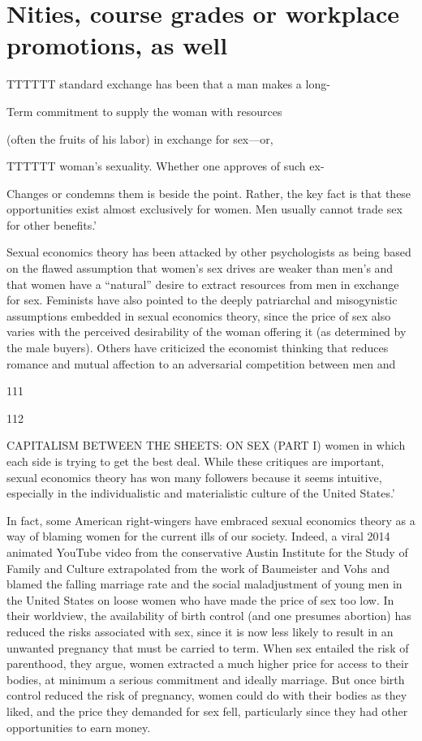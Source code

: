 \section{Nities, course grades or workplace promotions, as well}
 \par 
TTTTTT standard exchange has been that a man makes a long-
 \par 
Term commitment to supply the woman with resources
 \par 
(often the fruits of his labor) in exchange for sex—or,
 \par 
TTTTTT woman’s sexuality. Whether one approves of such ex-
 \par 
Changes or condemns them is beside the point. Rather, the key fact is that these opportunities exist almost exclusively for women. Men usually cannot trade sex for other benefits.’
 \par 
Sexual economics theory has been attacked by other psychologists as being based on the flawed assumption that women’s sex drives are weaker than men’s and that women have a “natural” desire to extract resources from men in exchange for sex. Feminists have also pointed to the deeply patriarchal and misogynistic assumptions embedded in sexual economics theory, since the price of sex also varies with the perceived desirability of the woman offering it (as determined by the male buyers). Others have criticized the economist thinking that reduces romance and mutual affection to an adversarial competition between men and
 \par 
111
 \par 
112
 \par 
CAPITALISM BETWEEN THE SHEETS: ON SEX (PART I) women in which each side is trying to get the best deal. While these critiques are important, sexual economics theory has won many followers because it seems intuitive, especially in the individualistic and materialistic culture of the United States.’
 \par 
In fact, some American right-wingers have embraced sexual economics theory as a way of blaming women for the current ills of our society. Indeed, a viral 2014 animated YouTube video from the conservative Austin Institute for the Study of Family and Culture extrapolated from the work of Baumeister and Vohs and blamed the falling marriage rate and the social maladjustment of young men in the United States on loose women who have made the price of sex too low. In their worldview, the availability of birth control (and one presumes abortion) has reduced the risks associated with sex, since it is now less likely to result in an unwanted pregnancy that must be carried to term. When sex entailed the risk of parenthood, they argue, women extracted a much higher price for access to their bodies, at minimum a serious commitment and ideally marriage. But once birth control reduced the risk of pregnancy, women could do with their bodies as they liked, and the price they demanded for sex fell, particularly since they had other opportunities to earn money.
 \par 

